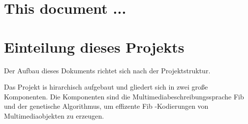 \documentclass[11pt,a4paper]{article}
\begin{document}
\section{This document ...}




\section{Einteilung dieses Projekts}

Der Aufbau dieses Dokuments richtet sich nach der Projektstruktur.

Das Projekt is hirarchisch aufgebaut und gliedert sich in zwei große Komponenten.
Die Komponenten sind die Multimediabeschreibungssprache Fib und der genetische Algorithmus, um effizente Fib -Kodierungen von Multimediaobjekten zu erzeugen.
\end{document}
